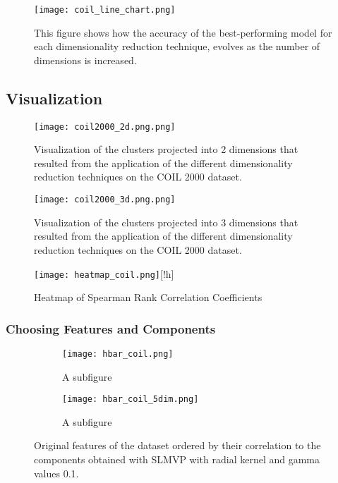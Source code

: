 \begin{figure}[!h]
    \centering
    \texttt{[image: coil\_line\_chart.png]}
    \caption{This figure shows how the accuracy of the best-performing model for each dimensionality reduction technique, evolves as the number of dimensions is increased.}
    \label{fig:coil_line_chart}
\end{figure}

\subsection{Visualization}

\begin{figure}[!h]
    \centering
    \texttt{[image: coil2000\_2d.png.png]}
    \caption{Visualization of the clusters projected into 2 dimensions that resulted from the application of the different dimensionality reduction techniques on the COIL 2000 dataset.}
    \label{fig:coil-2d}
\end{figure}

\begin{figure}[!h]
    \centering
    \texttt{[image: coil2000\_3d.png.png]}
    \caption{Visualization of the clusters projected into 3 dimensions that resulted from the application of the different dimensionality reduction techniques on the COIL 2000 dataset.}
    \label{fig:coil-3d}
\end{figure}

\begin{figure}
    \centering
    \texttt{[image: heatmap\_coil.png]}[!h]
    \caption{Heatmap of Spearman Rank Correlation Coefficients}
    \label{fig:heatmap-coil}
\end{figure}

\subsubsection{Choosing Features and Components}

\begin{figure}[!ht]
    \centering
    \begin{subfigure}{.5\textwidth}
        \centering
        \texttt{[image: hbar\_coil.png]}
        \caption{A subfigure}
    \end{subfigure}%
    \begin{subfigure}{.5\textwidth}
        \centering
        \texttt{[image: hbar\_coil\_5dim.png]}
        \caption{A subfigure}
    \end{subfigure}
    \caption{Original features of the dataset ordered by their correlation to the components obtained with SLMVP with radial kernel and gamma values 0.1.}
    \label{fig:test}
\end{figure}

